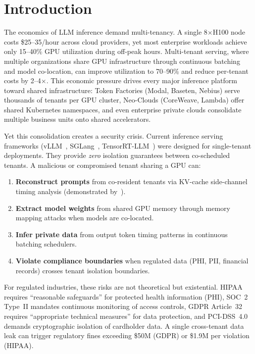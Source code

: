 \documentclass[conference,10pt]{IEEEtran}
\begin{document}
\section{Introduction}

The economics of LLM inference demand multi-tenancy. A single 8$\times$H100 node costs \$25--35/hour across cloud providers, yet most enterprise workloads achieve only 15--40\% GPU utilization during off-peak hours. Multi-tenant serving, where multiple organizations share GPU infrastructure through continuous batching and model co-location, can improve utilization to 70--90\% and reduce per-tenant costs by 2--4$\times$. This economic pressure drives every major inference platform toward shared infrastructure: Token Factories (Modal, Baseten, Nebius) serve thousands of tenants per GPU cluster, Neo-Clouds (CoreWeave, Lambda) offer shared Kubernetes namespaces, and even enterprise private clouds consolidate multiple business units onto shared accelerators.

Yet this consolidation creates a security crisis. Current inference serving frameworks (vLLM~\cite{kwon2023vllm}, SGLang~\cite{zheng2024sglang}, TensorRT-LLM~\cite{nvidia2024tensorrtllm}) were designed for single-tenant deployments. They provide \emph{zero} isolation guarantees between co-scheduled tenants. A malicious or compromised tenant sharing a GPU can:

\begin{enumerate}
\item \textbf{Reconstruct prompts} from co-resident tenants via KV-cache side-channel timing analysis (demonstrated by~\cite{cacheql2024}).
\item \textbf{Extract model weights} from shared GPU memory through memory mapping attacks when models are co-located.
\item \textbf{Infer private data} from output token timing patterns in continuous batching schedulers.
\item \textbf{Violate compliance boundaries} when regulated data (PHI, PII, financial records) crosses tenant isolation boundaries.
\end{enumerate}

For regulated industries, these risks are not theoretical but existential. HIPAA requires ``reasonable safeguards'' for protected health information (PHI), SOC~2 Type~II mandates continuous monitoring of access controls, GDPR Article~32 requires ``appropriate technical measures'' for data protection, and PCI-DSS~4.0 demands cryptographic isolation of cardholder data. A single cross-tenant data leak can trigger regulatory fines exceeding \$50M (GDPR) or \$1.9M per violation (HIPAA).
\end{document}
